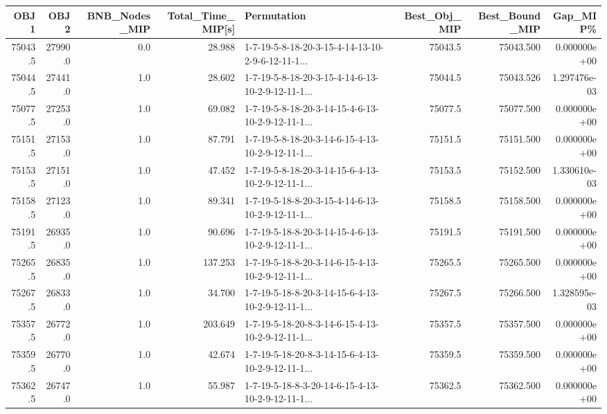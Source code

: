 \begin{tabular}{rrrrlrrr}
\toprule
    OBJ1 &     OBJ2 &  BNB\_Nodes\_MIP &  Total\_Time\_MIP[s] &                                        Permutation &  Best\_Obj\_MIP &  Best\_Bound\_MIP &      Gap\_MIP\% \\
\midrule
 75043.5 &  27990.0 &            0.0 &             28.988 &  1-7-19-5-8-18-20-3-15-4-14-13-10-2-9-6-12-11-1... &       75043.5 &       75043.500 &  0.000000e+00 \\
 75044.5 &  27441.0 &            1.0 &             28.602 &  1-7-19-5-8-18-20-3-15-4-14-6-13-10-2-9-12-11-1... &       75044.5 &       75043.526 &  1.297476e-03 \\
 75077.5 &  27253.0 &            1.0 &             69.082 &  1-7-19-5-8-18-20-3-14-15-4-6-13-10-2-9-12-11-1... &       75077.5 &       75077.500 &  0.000000e+00 \\
 75151.5 &  27153.0 &            1.0 &             87.791 &  1-7-19-5-8-18-20-3-14-6-15-4-13-10-2-9-12-11-1... &       75151.5 &       75151.500 &  0.000000e+00 \\
 75153.5 &  27151.0 &            1.0 &             47.452 &  1-7-19-5-8-18-20-3-14-15-6-4-13-10-2-9-12-11-1... &       75153.5 &       75152.500 &  1.330610e-03 \\
 75158.5 &  27123.0 &            1.0 &             89.341 &  1-7-19-5-18-8-20-3-15-4-14-6-13-10-2-9-12-11-1... &       75158.5 &       75158.500 &  0.000000e+00 \\
 75191.5 &  26935.0 &            1.0 &             90.696 &  1-7-19-5-18-8-20-3-14-15-4-6-13-10-2-9-12-11-1... &       75191.5 &       75191.500 &  0.000000e+00 \\
 75265.5 &  26835.0 &            1.0 &            137.253 &  1-7-19-5-18-8-20-3-14-6-15-4-13-10-2-9-12-11-1... &       75265.5 &       75265.500 &  0.000000e+00 \\
 75267.5 &  26833.0 &            1.0 &             34.700 &  1-7-19-5-18-8-20-3-14-15-6-4-13-10-2-9-12-11-1... &       75267.5 &       75266.500 &  1.328595e-03 \\
 75357.5 &  26772.0 &            1.0 &            203.649 &  1-7-19-5-18-20-8-3-14-6-15-4-13-10-2-9-12-11-1... &       75357.5 &       75357.500 &  0.000000e+00 \\
 75359.5 &  26770.0 &            1.0 &             42.674 &  1-7-19-5-18-20-8-3-14-15-6-4-13-10-2-9-12-11-1... &       75359.5 &       75359.500 &  0.000000e+00 \\
 75362.5 &  26747.0 &            1.0 &             55.987 &  1-7-19-5-18-8-3-20-14-6-15-4-13-10-2-9-12-11-1... &       75362.5 &       75362.500 &  0.000000e+00 \\

\end{tabular}
